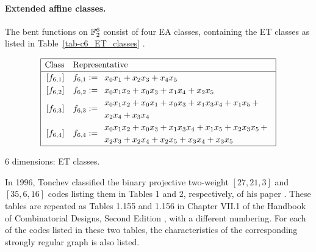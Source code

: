 \paragraph*{Extended affine classes.}
%
The bent functions on $\mathbb{F}_2^6$ consist of four
EA classes, containing the ET classes as listed in Table~\ref{tab-c6_ET_classes}
\cite[p. 303]{Rot76} \cite[Section 7.2]{Tok15bent}.
\begin{table}[!bhpt] %
\small{
\begin{align*}
\def\arraystretch{1.2}
\begin{array}{|cl|}
\hline
\text{Class} &
\text{Representative}
\\
\hline
\,[f_{6,1}] & f_{6,1} :=
\begin{array}{l}
x_{0} x_{1} + x_{2} x_{3} + x_{4} x_{5}
\end{array}
\\
\,[f_{6,2}] & f_{6,2} :=
\begin{array}{l}
x_{0} x_{1} x_{2} + x_{0} x_{3} + x_{1} x_{4} + x_{2} x_{5}
\end{array}
\\
\,[f_{6,3}] & f_{6,3} :=
\begin{array}{l}
x_{0} x_{1} x_{2} + x_{0} x_{1} + x_{0} x_{3} + x_{1} x_{3} x_{4} + x_{1} x_{5}\, +
\\
x_{2} x_{4} + x_{3} x_{4}
\end{array}
\\
\,[f_{6,4}] & f_{6,4} :=
\begin{array}{l}
x_{0} x_{1} x_{2} + x_{0} x_{3} + x_{1} x_{3} x_{4} + x_{1} x_{5} + x_{2} x_{3} x_{5}\, +
\\
x_{2} x_{3} + x_{2} x_{4} + x_{2} x_{5} + x_{3} x_{4} + x_{3} x_{5}
\end{array}
\\
\hline
\end{array}
\end{align*}
}
\caption{6 dimensions: ET classes.}
\label{tab-c6_ET_classes}
\end{table}

In 1996, Tonchev classified the binary projective two-weight $[27,21,3]$ and $[35,6,16]$ codes
listing them in Tables 1 and 2, respectively, of his paper \cite{Ton96uniformly}.
These tables are repeated as Tables 1.155 and 1.156 in Chapter VII.1 of the Handbook of
Combinatorial Designs, Second Edition \cite{Ton07codes},
with a different numbering.
For each of the codes listed in these two tables, the characteristics of the corresponding
strongly regular graph is also listed.

